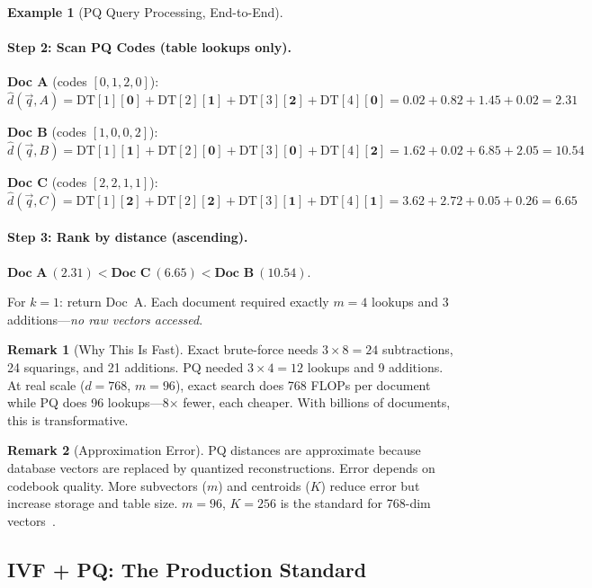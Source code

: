 \documentclass[11pt,a4paper]{article}
\theoremstyle{definition}
\newtheorem{example}{Example}[section]
\newtheorem{remark}{Remark}[section]
\theoremstyle{plain}
\begin{document}
\begin{example}[PQ Query Processing, End-to-End]
\paragraph{Step 2: Scan PQ Codes (table lookups only).}

\textbf{Doc A} (codes $[0, 1, 2, 0]$):
\[
\hat{d}(\vec{q}, A) = \mathrm{DT}[1][\mathbf{0}] + \mathrm{DT}[2][\mathbf{1}] + \mathrm{DT}[3][\mathbf{2}] + \mathrm{DT}[4][\mathbf{0}] = 0.02 + 0.82 + 1.45 + 0.02 = \mathbf{2.31}
\]

\textbf{Doc B} (codes $[1, 0, 0, 2]$):
\[
\hat{d}(\vec{q}, B) = \mathrm{DT}[1][\mathbf{1}] + \mathrm{DT}[2][\mathbf{0}] + \mathrm{DT}[3][\mathbf{0}] + \mathrm{DT}[4][\mathbf{2}] = 1.62 + 0.02 + 6.85 + 2.05 = \mathbf{10.54}
\]

\textbf{Doc C} (codes $[2, 2, 1, 1]$):
\[
\hat{d}(\vec{q}, C) = \mathrm{DT}[1][\mathbf{2}] + \mathrm{DT}[2][\mathbf{2}] + \mathrm{DT}[3][\mathbf{1}] + \mathrm{DT}[4][\mathbf{1}] = 3.62 + 2.72 + 0.05 + 0.26 = \mathbf{6.65}
\]

\paragraph{Step 3: Rank by distance (ascending).}
$\textbf{Doc A}\ (2.31) < \textbf{Doc C}\ (6.65) < \textbf{Doc B}\ (10.54)$.

For $k=1$: return Doc~A. Each document required exactly $m = 4$ lookups and 3 additions---\emph{no raw vectors accessed}.
\end{example}

\begin{remark}[Why This Is Fast]
Exact brute-force needs $3 \times 8 = 24$ subtractions, 24 squarings, and 21 additions. PQ needed $3 \times 4 = 12$ lookups and 9 additions. At real scale ($d = 768$, $m = 96$), exact search does 768 FLOPs per document while PQ does 96 lookups---8$\times$ fewer, each cheaper. With billions of documents, this is transformative.
\end{remark}

\begin{remark}[Approximation Error]
PQ distances are approximate because database vectors are replaced by quantized reconstructions. Error depends on codebook quality. More subvectors ($m$) and centroids ($K$) reduce error but increase storage and table size. $m = 96$, $K = 256$ is the standard for 768-dim vectors~\cite{jegou2011product}.
\end{remark}

\subsection{IVF + PQ: The Production Standard}
\end{document}
